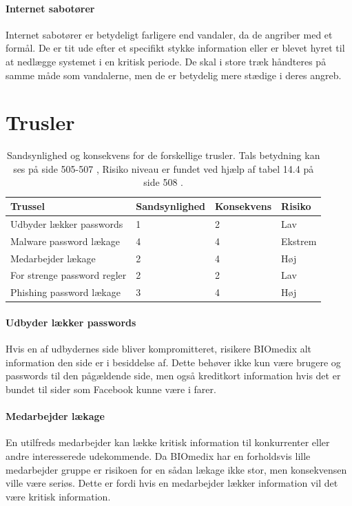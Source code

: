 \documentclass{article}
\begin{document}
\paragraph{Internet sabotører}
Internet sabotører er betydeligt farligere end vandaler, da de angriber med
et formål. De er tit ude efter et specifikt stykke information eller er 
blevet hyret til at nedlægge systemet i en kritisk periode. De skal i store
træk håndteres på samme måde som vandalerne, men de er betydelig mere stædige
i deres angreb.

\section{Trusler}

\begin{table}[h!]
    \begin{tabular}{l|l|l|l}
        Trussel                                    & Sandsynlighed & Konsekvens & Risiko\\\hline
        Udbyder lækker passwords                   & 1 & 2 & Lav\\
        Malware password lækage                   & 4 & 4 & Ekstrem\\
        Medarbejder lækage                        & 2 & 4 & Høj\\
        For strenge password regler                & 2 & 2 & Lav\\
        Phishing password lækage                  & 3 & 4 & Høj
    \end{tabular}
    \label{tab:Trusler}
    \caption{Sandsynlighed og konsekvens for de forskellige trusler. Tals betydning kan ses på side 505-507 \cite{Bog}, Risiko niveau er fundet ved hjælp af tabel 14.4 på side 508 \cite{Bog}.}
\end{table}

\paragraph{Udbyder lækker passwords}
Hvis en af udbydernes side bliver kompromitteret, risikere BIOmedix alt information
den side er i besiddelse af. Dette behøver ikke kun være brugere og passwords til
den pågældende side, men også kreditkort information hvis det er bundet til
sider som Facebook kunne være i farer.

\paragraph{Medarbejder lækage}
En utilfreds medarbejder kan lække kritisk information til konkurrenter
eller andre interesserede udekommende. Da BIOmedix har en forholdsvis lille
medarbejder gruppe er risikoen for en sådan lækage ikke stor, men konsekvensen
ville være seriøs. Dette er fordi hvis en medarbejder lækker information
vil det være kritisk information.
\end{document}
